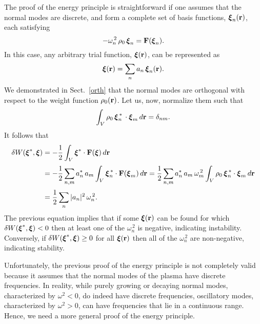\documentclass[12pt,prb,aps,notitlepage]{revtex4-1}
\newcommand{\bxi}{\mbox{\boldmath$\xi$}}
\begin{document}
The proof of the energy principle is straightforward if one assumes that the normal modes are discrete, and form a complete set of
basis functions, $\bxi_n({\bf r})$, each satisfying
\begin{equation}
-\omega_n^{\,2}\,\rho_0\,\bxi_n = {\bf F}({\bxi}_n).
\end{equation}
In this case, any arbitrary trial function, $\bxi({\bf r})$, can be represented as
\begin{equation}
\bxi({\bf r}) = \sum_n a_n\,\bxi_n({\bf r}).
\end{equation}
We demonstrated in Sect.~\ref{orth} that the normal modes are orthogonal with respect to the weight function $\rho_0({\bf r})$. Let us, now, 
normalize them such that 
\begin{equation}
\int_V \rho_0\,\bxi_n^{\,\ast}\,\cdot\bxi_m\,d{\bf r} = \delta_{nm}.
\end{equation}
It follows that
\begin{align}
\delta W(\bxi^\ast,\bxi) &= -\frac{1}{2}\int_V\bxi^\ast\cdot {\bf F}(\bxi)\,d{\bf r}\nonumber\\[0.5ex]
&= -\frac{1}{2}\sum_{n,m}a_n^{\ast}\,a_m\int_V \bxi_n^{\,\ast}\cdot {\bf F}(\bxi_m)\,d{\bf r}=\frac{1}{2}\sum_{n,m}a_n^{\ast}\,a_m\,\omega_m^{\,2}\int_V \rho_0\,\bxi_n^{\,\ast}\cdot \bxi_m\,d{\bf r}\nonumber\\[0.5ex]
&= \frac{1}{2}\sum_n|a_n|^2\,\omega_n^{\,2}.
\end{align}
The previous equation implies that if some $\bxi({\bf r})$ can be found for which $\delta W(\bxi^\ast,\bxi) <0$ then at least
one of the $\omega_n^{\,2}$ is negative, indicating instability. Conversely, if $\delta W(\bxi^\ast,\bxi)\geq 0$ for all
$\bxi({\bf r})$ then all of the $\omega_n^{\,2}$ are non-negative, indicating stability. 

Unfortunately, the previous proof of the energy principle is not completely valid because it assumes that  the normal modes of the plasma
have discrete frequencies. In reality, while purely growing or decaying normal modes, characterized by $\omega^2<0$, do indeed have discrete frequencies, oscillatory modes, characterized by 
$\omega^2>0$, can have frequencies that lie in a continuous range. Hence, we need a more general proof of the energy principle. 
\end{document}
